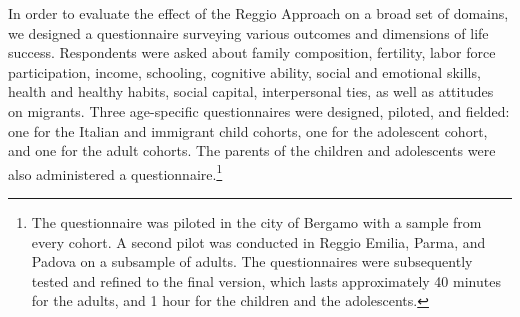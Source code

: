 
In order to evaluate the effect of the Reggio Approach on a broad set of domains, we designed a questionnaire surveying various outcomes and dimensions of life success. Respondents were asked about family composition, fertility, labor force participation, income, schooling, cognitive ability, social and emotional skills, health and healthy habits, social capital, interpersonal ties, as well as attitudes on migrants. Three age-specific questionnaires were designed, piloted, and fielded: one for the Italian and immigrant child cohorts, one for the adolescent cohort, and one for the adult cohorts. The parents of the children and adolescents were also administered a questionnaire.\footnote{The questionnaire was piloted in the city of Bergamo with a sample from every cohort. A second pilot was conducted in Reggio Emilia, Parma, and Padova on a subsample of adults. The questionnaires were subsequently tested and refined to the final version, which lasts approximately 40 minutes for the adults, and 1 hour for the children and the adolescents.} 
